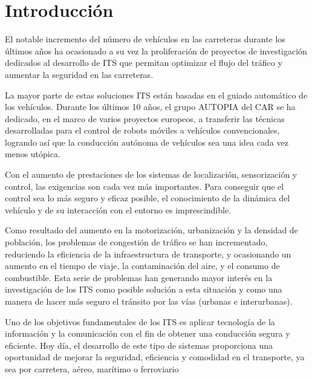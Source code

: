 
\chapter*{Introducción}
\label{chap:0_Introduccion}

\label{sec:Antecedentes}

El notable incremento del número de vehículos en las carreteras durante los últimos años ha ocasionado a su vez la proliferación de proyectos de investigación dedicados al desarrollo de \gls{ITS} que permitan optimizar el flujo del tráfico y aumentar la seguridad en las carreteras.

La mayor parte de estas soluciones \gls{ITS} están basadas en el guiado automático de los vehículos.  Durante los últimos 10 años, el grupo AUTOPIA del \gls{CAR} se ha dedicado, en el marco de varios proyectos europeos, a transferir las técnicas desarrolladas para el control de robots móviles a vehículos convencionales, logrando así que la  conducción autónoma de vehículos sea una idea cada vez menos utópica.
	
Con el aumento de prestaciones de los sistemas de localización, sensorización y control, las exigencias son cada vez más importantes. Para conseguir que el control sea lo más seguro y eficaz posible, el conocimiento de la dinámica del vehículo y de su interacción con el entorno es imprescindible.
   
\label{sec:justifiacion}


Como resultado del aumento en la motorización, urbanización y la densidad de población, los problemas de congestión de tráfico se han incrementado, reduciendo la eficiencia de la infraestructura de transporte, y ocasionando un aumento en el tiempo de viaje, la contaminación del aire, y el consumo de combustible. Esta serie de problemas han generando mayor interés en la investigación de los \gls{ITS} como posible solución a esta situación y como una manera de hacer más seguro el tránsito por las vías (urbanas e interurbanas).

Uno de los objetivos fundamentales de los \gls{ITS} es aplicar tecnología de la información y la comunicación con el fin de obtener una conducción segura y eficiente. Hoy día, el desarrollo de este tipo de sistemas proporciona una oportunidad de mejorar la seguridad, eficiencia y comodidad en el transporte, ya sea por carretera, aéreo, marítimo o ferroviario\cite{jones_k}

